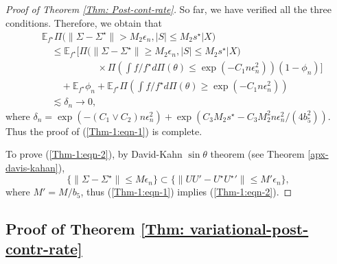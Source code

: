 \documentclass[pdftex, noinfoline, letter]{imsart}
\theoremstyle{plain}
\begin{document}
\begin{proof}[Proof of Theorem \ref{Thm: Post-cont-rate}]
So far, we have verified all the three conditions. Therefore, we obtain that 
\begin{align*}
    & \mathbb{E}_{f^\star} \Pi\Big(\|\Sigma - \Sigma^\star\| > M_2 \epsilon_n, 
    |S| \leq M_2 s^\star | X\Big)\\
    & \quad \leq 
    \mathbb{E}_{f^\star} 
    \Bigg[\Pi\Big(\|\Sigma - \Sigma^\star\| \geq M_2 \epsilon_n,
    |S| \leq M_2 s^\star | X\Big)  \\
    & \hspace{2cm} \quad \times \Pi\left( \int f/f^\star d\Pi(\theta) \leq \exp(-C_1n\epsilon_n^2)\right)(1-\phi_n)
    \Bigg]\\ 
    & \quad \quad 
    + \mathbb{E}_{f^\star} \phi_n
    + \mathbb{E}_{f^\star} 
    \Pi \left( 
    \int f/f^\star d\Pi(\theta) \geq \exp(-C_1n\epsilon_n^2)
    \right)\\
    & \quad \lesssim
    \delta_n \to 0,
\end{align*}
where $  \delta_n = \exp(- (C_1 \vee C_2) n\epsilon_n^2 )
    + \exp \left(
    C_3 M_2 s^\star - C_3 M_2^2 n \epsilon_n^2/(4 b_5^2)
    \right)$.
Thus the proof of (\ref{Thm-1:eqn-1}) is complete.    
    
To prove (\ref{Thm-1:eqn-2}), by David-Kahn $\sin \theta$ theorem (see Theorem \ref{apx-davis-kahan}),
$$\big\{\|\Sigma - \Sigma^\star\| \leq M \epsilon_n\big\} \subset \big\{\|UU' - U^\star {U^\star}'\| \leq M' \epsilon_n\big\},$$ where $M' = M/b_5$, thus (\ref{Thm-1:eqn-1}) implies (\ref{Thm-1:eqn-2}).
\end{proof}



\subsection{Proof of Theorem \ref{Thm: variational-post-contr-rate}}
\end{document}
